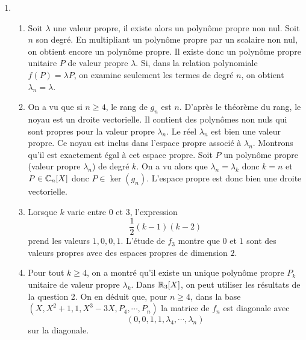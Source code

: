 \begin{enumerate}
\item
\begin{enumerate}
  \item Soit $\lambda$ une valeur propre, il existe alors un polynôme propre non nul. Soit $n$  son degré. En multipliant un polynôme propre par un scalaire non nul, on obtient encore un polynôme propre. Il existe donc un polynôme propre unitaire $P$ de valeur propre $\lambda$. Si, dans la relation polynomiale $f(P) = \lambda P$, on examine seulement les termes de degré $n$, on obtient $\lambda_n = \lambda$.
  \item On a vu que si $n\geq 4$, le rang de $g_n$ est $n$. D'après le théorème du rang, le noyau est un droite vectorielle. Il contient des polynômes non nuls qui sont propres pour la valeur propre $\lambda_n$. Le réel $\lambda_n$ est bien une valeur propre.\newline
  Ce noyau est inclus dans l'espace propre associé à $\lambda_n$. Montrons qu'il est exactement égal à cet espace propre.\newline
  Soit $P$ un polynôme propre (valeur propre $\lambda_n$) de degré $k$. On a vu alors que $\lambda_n = \lambda_k$ donc $k=n$ et $P\in \mathbb{C}_n[X]$ donc $P\in \ker(g_n)$. L'espace propre est donc bien une droite vectorielle. 
  \item Lorsque $k$ varie entre $0$ et $3$, l'expression
\begin{displaymath}
  \frac{1}{2}(k-1)(k-2)
\end{displaymath}
prend les valeurs $1, 0, 0, 1$. L'étude de $f_3$ montre que $0$ et $1$ sont des valeurs propres avec des espaces propres de dimension $2$.
  \item Pour tout $k\geq 4$, on a montré qu'il existe un unique polynôme propre $P_k$ unitaire de valeur propre $\lambda_k$.\newline
  Dans $\mathbb{R}_3[X]$, on peut utiliser les résultats de la question 2. On en déduit que, pour $n\geq 4$, dans la base $(X, X^2 + 1, 1 , X^3-3X, P_4, \cdots ,P_n)$ la matrice de $f_n$ est diagonale avec 
\begin{displaymath}
  (0, 0, 1, 1, \lambda_4, \cdots,\lambda_n)
\end{displaymath}
sur la diagonale.
\end{enumerate}
\end{enumerate}
